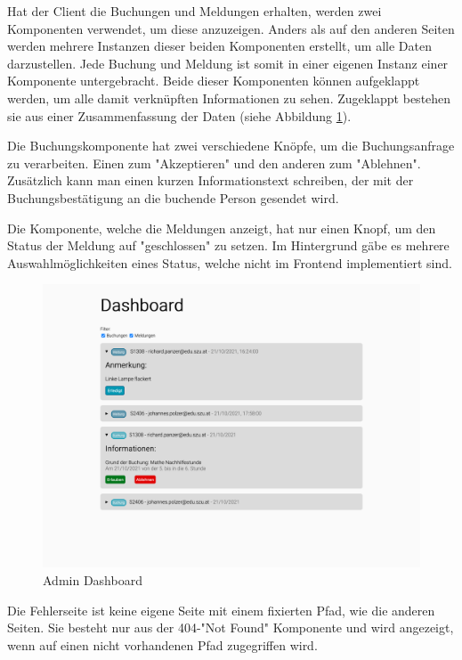 Hat der Client die Buchungen und Meldungen erhalten, werden zwei Komponenten verwendet, um diese anzuzeigen. Anders als auf den anderen Seiten werden mehrere Instanzen dieser beiden Komponenten erstellt, um alle Daten darzustellen. Jede Buchung und Meldung ist somit in einer eigenen Instanz einer Komponente untergebracht. Beide dieser Komponenten können aufgeklappt werden, um alle damit verknüpften Informationen zu sehen. Zugeklappt bestehen sie aus einer Zusammenfassung der Daten (siehe Abbildung \ref{fig:admindashboard}).

Die Buchungskomponente hat zwei verschiedene Knöpfe, um die Buchungsanfrage zu verarbeiten. Einen zum "Akzeptieren" und den anderen zum "Ablehnen". Zusätzlich kann man einen kurzen Informationstext schreiben, der mit der Buchungsbestätigung an die buchende Person gesendet wird. 

Die Komponente, welche die Meldungen anzeigt, hat nur einen Knopf, um den Status der Meldung auf "geschlossen" zu setzen. Im Hintergrund gäbe es mehrere Auswahlmöglichkeiten eines Status, welche nicht im Frontend implementiert sind.

\begin{figure}[H]
    \centering
    \includegraphics[width=120mm]{media/WebComponents/AdminSeite_light.png}
    \caption{Admin Dashboard}
    \label{fig:admindashboard}
\end{figure}

\begin{minipage}{\textwidth}
    Die Fehlerseite ist keine eigene Seite mit einem fixierten Pfad, wie die anderen Seiten. Sie besteht nur aus der 404-"Not Found" Komponente und wird angezeigt, wenn auf einen nicht vorhandenen Pfad zugegriffen wird. 
\end{minipage}

